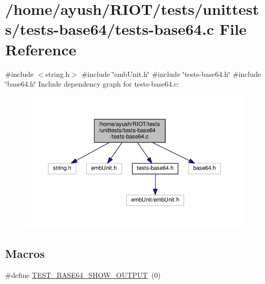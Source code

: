 \hypertarget{tests-base64_8c}{}\section{/home/ayush/\+R\+I\+O\+T/tests/unittests/tests-\/base64/tests-\/base64.c File Reference}
\label{tests-base64_8c}
{\ttfamily \#include $<$string.\+h$>$}\newline
{\ttfamily \#include \char`\"{}emb\+Unit.\+h\char`\"{}}\newline
{\ttfamily \#include \char`\"{}tests-\/base64.\+h\char`\"{}}\newline
{\ttfamily \#include \char`\"{}base64.\+h\char`\"{}}\newline
Include dependency graph for tests-\/base64.c\+:
\nopagebreak
\begin{figure}[H]
\begin{center}
\leavevmode
\includegraphics[width=350pt]{tests-base64_8c__incl}
\end{center}
\end{figure}
\subsection*{Macros}
\begin{DoxyCompactItemize}
\item 
\#define \hyperlink{tests-base64_8c_a892fe6a6f4c4da92824f99a59dd4229b}{T\+E\+S\+T\+\_\+\+B\+A\+S\+E64\+\_\+\+S\+H\+O\+W\+\_\+\+O\+U\+T\+P\+UT}~(0)
\end{DoxyCompactItemize}
